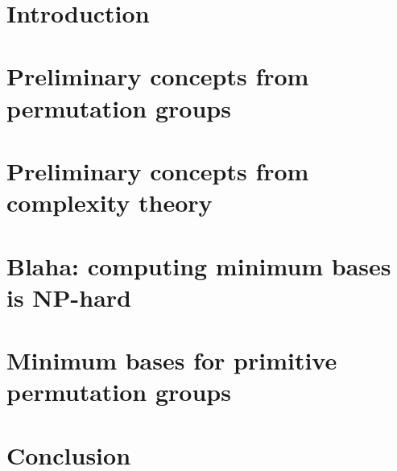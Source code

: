 \documentclass[openany]{book}
\title{\textbf{\TITLE}}
\author{\textbf{\AUTHOR}}
\date{\textbf{\DATE}}
\begin{document}



\tableofcontents

\chapter{Introduction}




\chapter{Preliminary concepts from permutation groups}



\chapter{Preliminary concepts from complexity theory}



\chapter{Blaha: computing minimum bases is NP-hard}



\chapter{Minimum bases for primitive permutation groups}



\chapter{Conclusion}



\nocite{*}
\renewcommand{\bibname}{References}

\appendix


\end{document}
